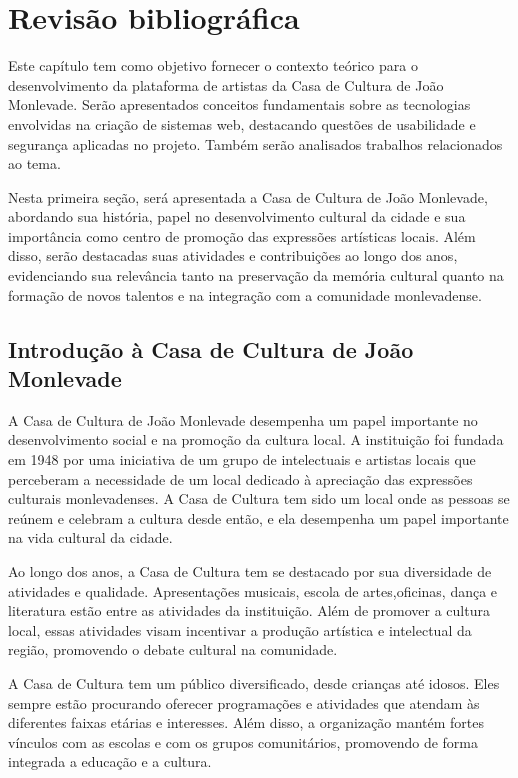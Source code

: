 \chapter{Revisão bibliográfica}
\label{cap:revisao}
Este capítulo tem como objetivo fornecer o contexto teórico para o desenvolvimento da plataforma de artistas da Casa de Cultura de João Monlevade. Serão apresentados conceitos fundamentais sobre as tecnologias envolvidas na criação de sistemas web, destacando questões de usabilidade e segurança aplicadas no projeto. Também serão analisados trabalhos relacionados ao tema.

Nesta primeira seção, será apresentada a Casa de Cultura de João Monlevade, abordando sua história, papel no desenvolvimento cultural da cidade e sua importância como centro de promoção das expressões artísticas locais. Além disso, serão destacadas suas atividades e contribuições ao longo dos anos, evidenciando sua relevância tanto na preservação da memória cultural quanto na formação de novos talentos e na integração com a comunidade monlevadense.


\section{Introdução à Casa de Cultura de João Monlevade}
A Casa de Cultura de João Monlevade desempenha um papel importante no desenvolvimento social e na promoção da cultura local. A instituição foi fundada em 1948 por uma iniciativa de um grupo de intelectuais e artistas locais que perceberam a necessidade de um local dedicado à apreciação das expressões culturais monlevadenses. A Casa de Cultura tem sido um local onde as pessoas se reúnem e celebram a cultura desde então, e ela desempenha um papel importante na vida cultural da cidade.

Ao longo dos anos, a Casa de Cultura tem se destacado por sua diversidade de atividades e qualidade. Apresentações musicais, escola de artes,oficinas, dança e literatura estão entre as atividades da instituição. Além de promover a cultura local, essas atividades visam incentivar a produção artística e intelectual da região, promovendo o debate cultural na comunidade.

A Casa de Cultura tem um público diversificado, desde crianças até idosos. Eles sempre estão procurando oferecer programações e atividades que atendam às diferentes faixas etárias e interesses. Além disso, a organização mantém fortes vínculos com as escolas e com os grupos comunitários, promovendo de forma integrada a educação e a cultura.

